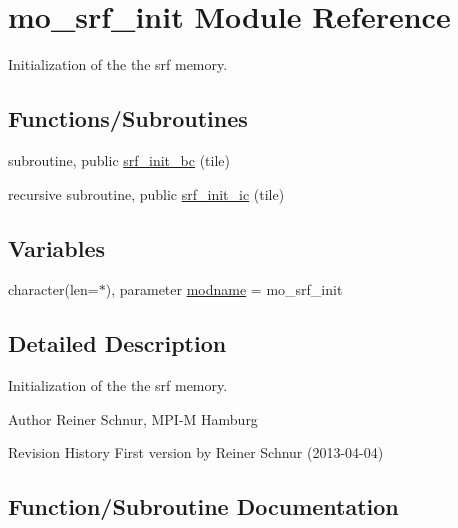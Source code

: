 \hypertarget{namespacemo__srf__init}{}\section{mo\+\_\+srf\+\_\+init Module Reference}
\label{namespacemo__srf__init}


Initialization of the the srf memory.  


\subsection*{Functions/\+Subroutines}
\begin{DoxyCompactItemize}
\item 
subroutine, public \hyperlink{namespacemo__srf__init_a7c44e1a5211e8f4702bfd3724031f8d7}{srf\+\_\+init\+\_\+bc} (tile)
\item 
recursive subroutine, public \hyperlink{namespacemo__srf__init_a7991eb826bda9d166a7e59489d44ea9b}{srf\+\_\+init\+\_\+ic} (tile)
\end{DoxyCompactItemize}
\subsection*{Variables}
\begin{DoxyCompactItemize}
\item 
character(len=$\ast$), parameter \hyperlink{namespacemo__srf__init_aa48301154b912ae072ff1916d431321b}{modname} = \textquotesingle{}mo\+\_\+srf\+\_\+init\textquotesingle{}
\end{DoxyCompactItemize}


\subsection{Detailed Description}
Initialization of the the srf memory. 

\begin{DoxyAuthor}{Author}
Reiner Schnur, M\+P\+I-\/\+M Hamburg
\end{DoxyAuthor}
\begin{DoxyParagraph}{Revision History}
First version by Reiner Schnur (2013-\/04-\/04) 
\end{DoxyParagraph}


\subsection{Function/\+Subroutine Documentation}
\hypertarget{namespacemo__srf__init_a7c44e1a5211e8f4702bfd3724031f8d7}{}
